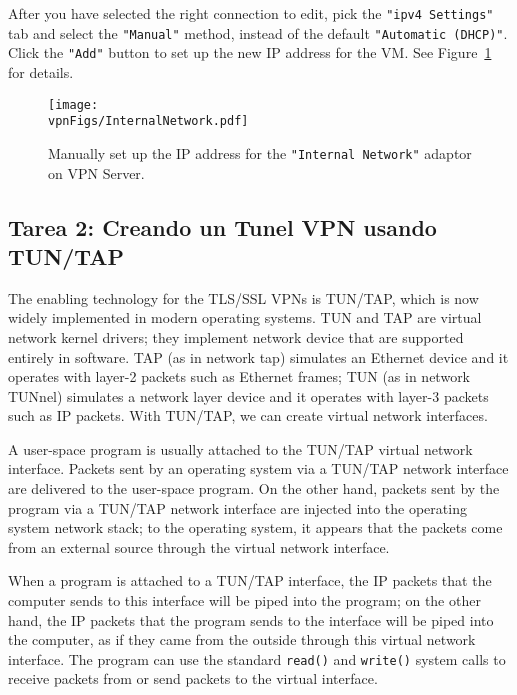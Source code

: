 After you have selected the right connection to edit, 
pick the \texttt{"ipv4 Settings"} tab and select the 
\texttt{"Manual"} method, instead of the default \texttt{"Automatic (DHCP)"}. Click 
the \texttt{"Add"} button to set up the new IP address for the VM. See
Figure~\ref{vpn:fig:internalnetwork} for details. 



\begin{figure}[htb]
\begin{center}
\texttt{[image: \\vpnFigs/InternalNetwork.pdf]}
\end{center}
\caption{Manually set up the IP address for the \texttt{"Internal Network"} adaptor on VPN
Server.}
\label{vpn:fig:internalnetwork}
\end{figure}
 


\subsection{Tarea 2: Creando un Tunel VPN usando TUN/TAP}



The enabling technology for the TLS/SSL VPNs is 
TUN/TAP, which is now widely implemented in modern operating systems.
TUN and TAP are virtual network kernel drivers; they 
implement network device that are supported entirely in software.
TAP (as in network tap) simulates an Ethernet device and it operates with 
layer-2 packets such as Ethernet frames; TUN (as in network TUNnel) simulates a
network layer device and it operates with layer-3 packets such as IP packets.
With TUN/TAP, we can create virtual network interfaces. 


A user-space program is usually attached to the TUN/TAP virtual network interface.
Packets sent by an operating system via a TUN/TAP network interface 
are delivered to the user-space program. On the other hand,
packets sent by the program
via a TUN/TAP network interface are injected into the operating system
network stack; to the operating system,
it appears that the packets come from an external source
through the virtual network interface.


When a program is attached to a TUN/TAP interface, the IP packets that 
the computer sends to this interface will be piped into the 
program; on the other hand, the IP packets that the program sends to the 
interface will be piped into the computer, as if they came from 
the outside through this virtual network interface. The program can use 
the standard {\tt read()} and {\tt write()} system calls to receive packets 
from or send packets to the virtual interface.


